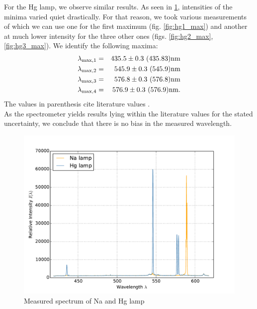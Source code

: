 For the Hg lamp, we observe similar results. As seen in \ref{fig:spectrum_all}, intensities 
of the minima varied quiet drastically. For that reason, we took various measurements of which 
we can use one for the first maximum (fig. \ref{fig:hg1_max}) and another at much lower 
intensity for the three other ones (figs. \ref{fig:hg2_max}, \ref{fig:hg3_max}). 
We identify the following maxima:
\begin{eqnarray*}
    \lambda_\mathrm{max, 1} &=& 435.5 \pm 0.3 \ (435.83)\mathrm{nm} \\
    \lambda_\mathrm{max, 2} &=& 545.9 \pm 0.3 \ (545.9)\mathrm{nm} \\
    \lambda_\mathrm{max, 3} &=& 576.8 \pm 0.3 \ (576.8)\mathrm{nm} \\
    \lambda_\mathrm{max, 4} &=& 576.9 \pm 0.3 \ (576.9)\mathrm{nm}.
\end{eqnarray*}
The values in parenthesis cite literature values \cite{}. \\
As the spectrometer yields results lying within the literature values for the 
stated uncertainty, we conclude that there is no bias in the measured wavelength.

\begin{figure}
\centering
\includegraphics[width=\pltw]{analysis/figures/spectrum_all.pdf}
\caption{Measured spectrum of Na and Hg lamp}
\label{fig:spectrum_all}
\end{figure}

